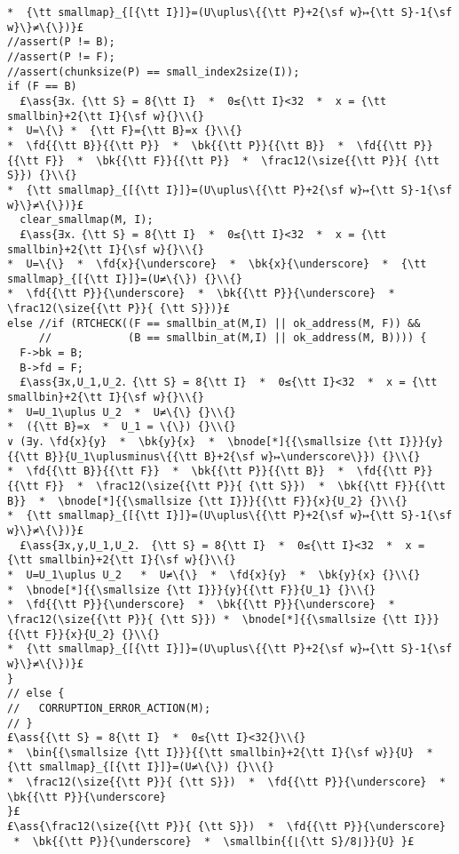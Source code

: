 \documentclass[10pt,a4paper,twoside]{report}
\makeatletter
\newcommand{\ml}[2][t]{\mbox{\mdseries\begin{tabular}[#1]{@{}L@{}}#2\end{tabular}}}
\newcommand{\ass}[1]{\ensuremath{{\color{blue}\left\{\ml[c]{#1}\right\}}}}
\makeatother
\begin{document}
\begin{lstlisting}
*  {\tt smallmap}_{[{\tt I}]}=(U\uplus\{{\tt P}+2{\sf w}↦{\tt S}-1{\sf w}\}≠\{\})}£
//assert(P != B);
//assert(P != F);
//assert(chunksize(P) == small_index2size(I));
if (F == B)
  £\ass{∃x．{\tt S} = 8{\tt I}  *  0≤{\tt I}<32  *  x = {\tt smallbin}+2{\tt I}{\sf w}{}\\{}
*  U=\{\} *  {\tt F}={\tt B}=x {}\\{}
*  \fd{{\tt B}}{{\tt P}}  *  \bk{{\tt P}}{{\tt B}}  *  \fd{{\tt P}}{{\tt F}}  *  \bk{{\tt F}}{{\tt P}}  *  \frac12(\size{{\tt P}}{ {\tt S}}) {}\\{}
*  {\tt smallmap}_{[{\tt I}]}=(U\uplus\{{\tt P}+2{\sf w}↦{\tt S}-1{\sf w}\}≠\{\})}£
  clear_smallmap(M, I);
  £\ass{∃x．{\tt S} = 8{\tt I}  *  0≤{\tt I}<32  *  x = {\tt smallbin}+2{\tt I}{\sf w}{}\\{}
*  U=\{\}  *  \fd{x}{\underscore}  *  \bk{x}{\underscore}  *  {\tt smallmap}_{[{\tt I}]}=(U≠\{\}) {}\\{}
*  \fd{{\tt P}}{\underscore}  *  \bk{{\tt P}}{\underscore}  *  \frac12(\size{{\tt P}}{ {\tt S}})}£
else //if (RTCHECK((F == smallbin_at(M,I) || ok_address(M, F)) &&
     //            (B == smallbin_at(M,I) || ok_address(M, B)))) {
  F->bk = B;
  B->fd = F;
  £\ass{∃x,U_1,U_2．{\tt S} = 8{\tt I}  *  0≤{\tt I}<32  *  x = {\tt smallbin}+2{\tt I}{\sf w}{}\\{}
*  U=U_1\uplus U_2  *  U≠\{\} {}\\{}
*  ({\tt B}=x  *  U_1 = \{\}) {}\\{}
∨ (∃y．\fd{x}{y}  *  \bk{y}{x}  *  \bnode[*]{{\smallsize {\tt I}}}{y}{{\tt B}}{U_1\uplusminus\{{\tt B}+2{\sf w}↦\underscore\}}) {}\\{}
*  \fd{{\tt B}}{{\tt F}}  *  \bk{{\tt P}}{{\tt B}}  *  \fd{{\tt P}}{{\tt F}}  *  \frac12(\size{{\tt P}}{ {\tt S}})  *  \bk{{\tt F}}{{\tt B}}  *  \bnode[*]{{\smallsize {\tt I}}}{{\tt F}}{x}{U_2} {}\\{}
*  {\tt smallmap}_{[{\tt I}]}=(U\uplus\{{\tt P}+2{\sf w}↦{\tt S}-1{\sf w}\}≠\{\})}£
  £\ass{∃x,y,U_1,U_2． {\tt S} = 8{\tt I}  *  0≤{\tt I}<32  *  x = {\tt smallbin}+2{\tt I}{\sf w}{}\\{}
*  U=U_1\uplus U_2   *  U≠\{\}  *  \fd{x}{y}  *  \bk{y}{x} {}\\{}
*  \bnode[*]{{\smallsize {\tt I}}}{y}{{\tt F}}{U_1} {}\\{}
*  \fd{{\tt P}}{\underscore}  *  \bk{{\tt P}}{\underscore}  *  \frac12(\size{{\tt P}}{ {\tt S}}) *  \bnode[*]{{\smallsize {\tt I}}}{{\tt F}}{x}{U_2} {}\\{}
*  {\tt smallmap}_{[{\tt I}]}=(U\uplus\{{\tt P}+2{\sf w}↦{\tt S}-1{\sf w}\}≠\{\})}£
}
// else {
//   CORRUPTION_ERROR_ACTION(M);
// }
£\ass{{\tt S} = 8{\tt I}  *  0≤{\tt I}<32{}\\{}
*  \bin{{\smallsize {\tt I}}}{{\tt smallbin}+2{\tt I}{\sf w}}{U}  *  {\tt smallmap}_{[{\tt I}]}=(U≠\{\}) {}\\{}
*  \frac12(\size{{\tt P}}{ {\tt S}})  *  \fd{{\tt P}}{\underscore}  *  \bk{{\tt P}}{\underscore}
}£
£\ass{\frac12(\size{{\tt P}}{ {\tt S}})  *  \fd{{\tt P}}{\underscore}  *  \bk{{\tt P}}{\underscore}  *  \smallbin{{⌊{\tt S}/8⌋}}{U} }£

\end{lstlisting}
\end{document}
